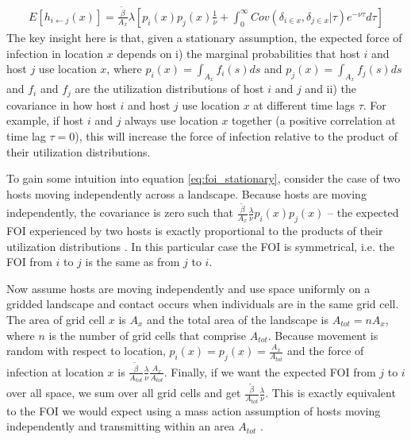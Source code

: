 \documentclass[letterpaper]{article}
\begin{document}
\begin{equation}
    \begin{aligned}
    E[h_{i \leftarrow j}(x)] = \frac{\tilde{\beta}}{A_x} \lambda [p_i(x)p_j(x) \frac{1}{\nu} + \int_{0}^{\infty} Cov(\delta_{i \in x}, \delta_{j \in x} | \tau) e^{-\nu \tau} d\tau]
    \end{aligned}
    \label{eq:foi_stationary}
\end{equation}
The key insight here is that, given a stationary assumption, the expected force of infection in location $x$ depends on i) the marginal probabilities that host $i$ and host $j$ use location $x$, where $p_i(x) = \int_{A_x} f_i(s) ds$ and $p_j(x) = \int_{A_x} f_j(s) ds$ and $f_i$ and $f_j$ are the utilization distributions of host $i$ and $j$ and ii) the covariance in how host $i$ and host $j$ use location $x$ at different time lags $\tau$. 
For example, if host $i$ and $j$ always use location $x$ together (a positive correlation at time lag $\tau = 0$), this will increase the force of infection relative to the product of their utilization distributions.  

To gain some intuition into equation \ref{eq:foi_stationary}, consider the case of two hosts moving independently across a landscape. 
Because hosts are moving independently, the covariance is zero such that $\frac{\tilde{\beta}}{A_x} \frac{\lambda}{\nu} p_i(x)p_j(x)$ -- the expected FOI experienced by two hosts is exactly proportional to the products of their utilization distributions \citep[similar to the result given in][]{Noonan2021}.  In this particular case the FOI is symmetrical, i.e. the FOI from $i$ to $j$ is the same as from $j$ to $i$.

Now assume hosts are moving independently and use space uniformly on a gridded landscape and contact occurs when individuals are in the same grid cell.  The area of grid cell $x$ is $A_x$ and the total area of the landscape is $A_{tot} = n A_x$, where $n$ is the number of grid cells that comprise $A_{tot}$. Because movement is random with respect to location, $p_i(x) = p_j(x) = \frac{A_x}{A_{tot}}$ and the force of infection at location $x$ is $\frac{\tilde{\beta}}{A_{tot}} \frac{\lambda}{\nu} \frac{A_x}{A_{tot}}$.  Finally, if we want the expected FOI from $j$ to $i$ over all space, we sum over all grid cells and get $\frac{\tilde{\beta}}{A_{tot}} \frac{\lambda}{\nu}$. This is exactly equivalent to the FOI we would expect using a mass action assumption of hosts moving independently and transmitting within an area $A_{tot}$ \citep{McCallum2001}.
\end{document}
